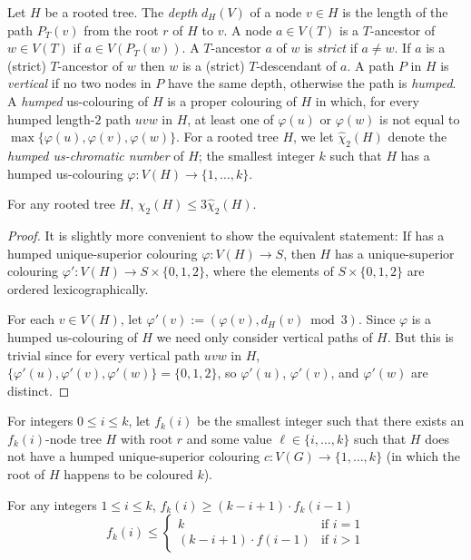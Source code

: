 \documentclass[kpfonts]{patmorin}
\newcommand{\uqs}{\chi_2}
\newcommand{\hus}{\hat{\chi}_2}
\begin{document}
Let $H$ be a rooted tree.  The \emph{depth} $d_H(V)$ of a node $v\in H$ is the length of the path $P_T(v)$ from the root $r$ of $H$ to $v$.  A node $a\in V(T)$ is a $T$-ancestor of $w\in V(T)$ if $a\in V(P_T(w))$.  A $T$-ancestor $a$ of $w$ is \emph{strict} if $a\neq w$.  If $a$ is a (strict) $T$-ancestor of $w$ then $w$ is a (strict) $T$-descendant of $a$.  A path $P$ in $H$ is \emph{vertical} if no two nodes in $P$ have the same depth, otherwise the path is \emph{humped}.  A \emph{humped} us-colouring of $H$ is a proper colouring of $H$ in which, for every humped length-$2$ path $uvw$ in $H$, at least one of $\varphi(u)$ or $\varphi(w)$ is not equal to $\max\{\varphi(u),\varphi(v),\varphi(w)\}$.  For a rooted tree $H$, we let $\hus(H)$ denote the \emph{humped us-chromatic number} of $H$; the smallest integer $k$ such that $H$ has a humped us-colouring $\varphi:V(H)\to\{1,\ldots,k\}$.

\begin{lem}\label{product}
    For any rooted tree $H$, $\uqs(H)\le 3\hus(H)$.
\end{lem}

\begin{proof}
    It is slightly more convenient to show the equivalent statement: If has a humped unique-superior colouring $\varphi:V(H)\to S$, then $H$ has a unique-superior colouring $\varphi':V(H)\to S\times\{0,1,2\}$, where the elements of $S\times\{0,1,2\}$ are ordered lexicographically.

    For each $v\in V(H)$, let $\varphi'(v):=(\varphi(v), d_H(v)\bmod 3)$. Since $\varphi$ is a humped us-colouring of $H$ we need only consider vertical paths of $H$.  But this is trivial since for every vertical path $uvw$ in $H$, $\{\varphi'(u),\varphi'(v),\varphi'(w)\}=\{0,1,2\}$, so $\varphi'(u)$, $\varphi'(v)$, and $\varphi'(w)$ are distinct.
\end{proof}

For integers $0\le i\le k$, let $f_k(i)$ be the smallest integer such that there exists an $f_k(i)$-node tree $H$ with root $r$ and some value $\ell \in\{i,\ldots,k\}$ such that $H$ does not have a humped unique-superior colouring $c:V(G)\to \{1,\ldots,k\}$ (in which the root of $H$ happens to be coloured $k$).

\begin{lem}\label{recursion}
    For any integers $1\le  i\le k$, $f_k(i) \ge (k-i+1)\cdot f_k(i-1)$
    \[
        f_k(i) \le \begin{cases}
                    k & \text{if $i=1$} \\
                    (k-i+1)\cdot f(i-1) & \text{if $i>1$}
                 \end{cases}
    \]
\end{lem}
\end{document}
